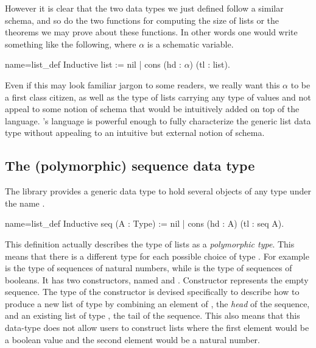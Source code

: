 However it is clear that the two data types we just defined follow
a similar schema, and so do the two functions for computing the size of lists
or the theorems we may prove about these functions.  In other words
one would write something
like the following, where $\alpha$ is a schematic variable.

\begin{coq}{name=list_def}{}
Inductive list := nil | cons (hd : $\alpha$) (tl : list).
\end{coq}

\noindent Even if this may look familiar jargon to some readers, we really want
this $\alpha$ to be a first class citizen, as well as the type of lists carrying
any type of values and not appeal to some notion of schema that would be
intuitively added on top of the \Coq{} language. %
%
\Coq{}'s language is powerful enough to fully characterize the generic
list data type without appealing to an intuitive but external notion of
schema.

\subsection{The (polymorphic) sequence data type}

The \mcbMC{} library provides a generic data type to hold
several objects of any type under the name .

\begin{coq}{name=list_def}{}
Inductive seq (A : Type) := nil | cons (hd : A) (tl : seq A).
\end{coq}
This definition actually describes the type of lists as a {\em
  polymorphic type}.  This means that there is a different type
 for each possible choice of type .  For example
 is the type of sequences of natural numbers, while
 is the type of sequences of booleans. It has two
constructors, named  and . Constructor 
represents the empty sequence. The type of the
constructor  is devised specifically to describe how to produce a
new list of type  by combining an element of , the
\emph{head} of the sequence, and an
existing list of type , the tail of the sequence.  This
also means that this data-type
does not allow users to construct lists where the first element would be
a boolean value and the second element would be a natural number.


